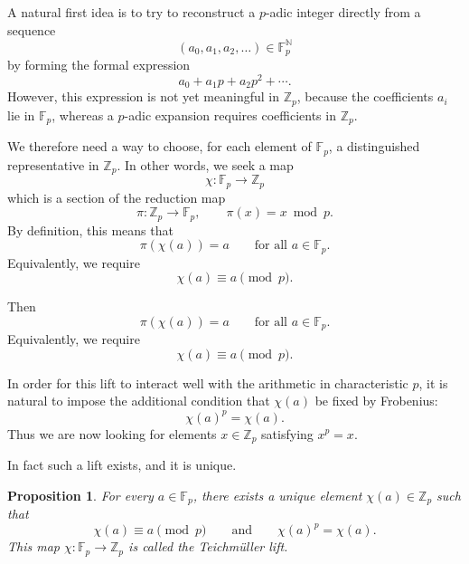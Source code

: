 \documentclass[oneside, a4paper, onecolumn, 11pt]{article}
\newtheorem{proposition}{Proposition}
\theoremstyle{definition}
\begin{document}
A natural first idea is to try to reconstruct a $p$-adic integer directly from a sequence
\[(a_0,a_1,a_2,\ldots)\in \mathbb{F}_p^{\mathbb N}\]
by forming the formal expression
\[a_0+a_1p+a_2p^2+\cdots.\]
However, this expression is not yet meaningful in $\mathbb{Z}_p$, because the coefficients $a_i$ lie in $\mathbb{F}_p$, whereas a $p$-adic expansion requires coefficients in $\mathbb{Z}_p$.

We therefore need a way to choose, for each element of $\mathbb{F}_p$, a distinguished representative in $\mathbb{Z}_p$. In other words, we seek a map
\[\chi:\mathbb{F}_p\to\mathbb{Z}_p\]
which is a section of the reduction map
\[\pi:\mathbb{Z}_p\to\mathbb{F}_p,\qquad \pi(x)=x \bmod p.\]
By definition, this means that
\[\pi(\chi(a))=a\qquad \text{for all } a\in\mathbb{F}_p.\]
Equivalently, we require
\[\chi(a)\equiv a \pmod p.\]

Then \[\pi(\chi(a))=a \qquad\text{for all } a\in\mathbb{F}_p.\]
Equivalently, we require \[ \chi(a)\equiv a \pmod p.\]

In order for this lift to interact well with the arithmetic in characteristic $p$, it is natural to impose the additional condition that $\chi(a)$ be fixed by Frobenius: \[\chi(a)^p=\chi(a).\]
Thus we are now looking for elements $x\in\mathbb{Z}_p$ satisfying $x^p=x$.

In fact such a lift exists, and it is unique. 

\begin{proposition}
For every $a\in\mathbb{F}_p$, there exists a unique element $\chi(a)\in\mathbb{Z}_p$ such that
\[\chi(a)\equiv a \pmod p \qquad \text{and} \qquad \chi(a)^p=\chi(a).\]
This map $\chi:\mathbb{F}_p\to\mathbb{Z}_p$ is called the Teichmüller lift.
\end{proposition}
\end{document}
